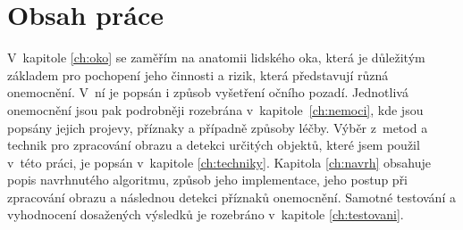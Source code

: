 \section{Obsah práce}
V~kapitole \ref{ch:oko} se zaměřím na anatomii lidského oka, která je důležitým základem pro pochopení jeho činnosti a rizik, která představují různá onemocnění. V~ní je popsán i způsob vyšetření očního pozadí. Jednotlivá onemocnění jsou pak podrobněji rozebrána v~kapitole~\ref{ch:nemoci}, kde jsou popsány jejich projevy, příznaky a případně způsoby léčby. Výběr z~metod a technik pro zpracování obrazu a detekci určitých objektů, které jsem použil v~této práci, je popsán v~kapitole \ref{ch:techniky}. Kapitola \ref{ch:navrh} obsahuje popis navrhnutého algoritmu, způsob jeho implementace, jeho postup při zpracování obrazu a následnou detekci příznaků onemocnění. Samotné testování a vyhodnocení dosažených výsledků je rozebráno v~kapitole \ref{ch:testovani}.
